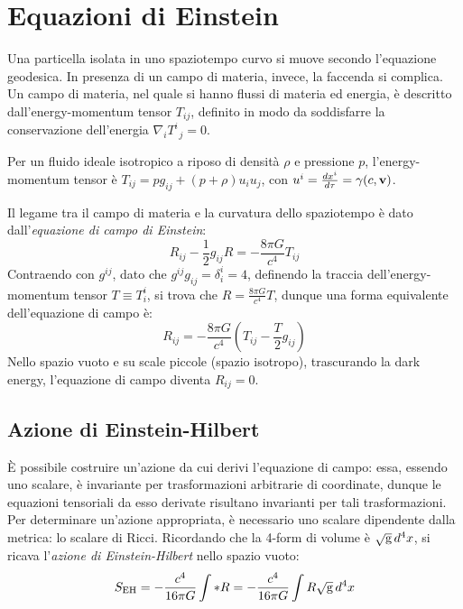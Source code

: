 \section{Equazioni di Einstein}

Una particella isolata in uno spaziotempo curvo si muove secondo l'equazione geodesica. In presenza di un campo di materia, invece, la faccenda si complica.\\
Un campo di materia, nel quale si hanno flussi di materia ed energia, è descritto dall'energy-momentum tensor $ T_{ij} $, definito in modo da soddisfarre la conservazione dell'energia $ \nabla_i T^i_{\,\,\,j} = 0 $.

\begin{example}
	Per un fluido ideale isotropico a riposo di densità $ \rho $ e pressione $ p $, l'energy-momentum tensor è $ T_{ij} = p g_{ij} + (p + \rho)u_i u_j $, con $ u^i = \frac{dx^i}{d\tau} = \gamma (c, \mathbf{v}) $.
\end{example}

Il legame tra il campo di materia e la curvatura dello spaziotempo è dato dall'\textit{equazione di campo di Einstein}:
\begin{equation}
	R_{ij} - \frac{1}{2} g_{ij} R = - \frac{8\pi G}{c^4} T_{ij}
	\label{eq:5.34}
\end{equation}
Contraendo con $ g^{ij} $, dato che $ g^{ij}g_{ij} = \delta^i_i = 4 $, definendo la traccia dell'energy-momentum tensor $ T \equiv T^i_i $, si trova che $ R = \frac{8\pi G}{c^4} T $, dunque una forma equivalente dell'equazione di campo è:
\begin{equation}
	R_{ij} = - \frac{8\pi G}{c^4} \left( T_{ij} - \frac{T}{2} g_{ij} \right)
	\label{eq:5.35}
\end{equation}
Nello spazio vuoto e su scale piccole (spazio isotropo), trascurando la dark energy, l'equazione di campo diventa $ R_{ij} = 0 $.

\subsection{Azione di Einstein-Hilbert}

È possibile costruire un'azione da cui derivi l'equazione di campo: essa, essendo uno scalare, è invariante per trasformazioni arbitrarie di coordinate, dunque le equazioni tensoriali da esso derivate risultano invarianti per tali trasformazioni.\\
Per determinare un'azione appropriata, è necessario uno scalare dipendente dalla metrica: lo scalare di Ricci. Ricordando che la 4-form di volume è $ \sqrt{\mathrm{g}} \,d^4x $, si ricava l'\textit{azione di Einstein-Hilbert} nello spazio vuoto:
\begin{equation}
	S_{\text{EH}} = - \frac{c^4}{16 \pi G} \int *R = - \frac{c^4}{16\pi G} \int R \sqrt{\mathrm{g}} \,d^4x
	\label{eq:5.36}
\end{equation}

